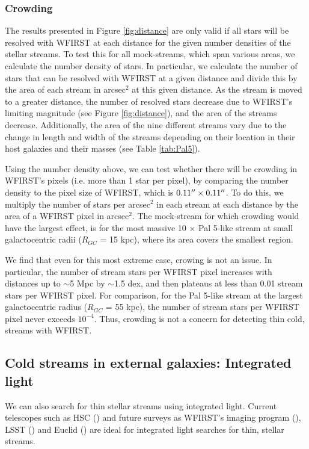 \documentclass[twocolumn]{aastex62}
\begin{document}
\subsubsection{Crowding}
\label{sec:crowding}
The results presented in Figure \ref{fig:distance} are only valid if all stars will be resolved with WFIRST at each distance for the given number densities of the stellar streams. To test this for all mock-streams, which span various areas, we calculate the number density of stars. In particular, we calculate the number of stars that can be resolved with WFIRST at a given distance and divide this by the area of each stream in arcsec$^2$ at this given distance. As the stream is moved to a greater distance, the number of resolved stars decrease due to WFIRST's limiting magnitude (see Figure \ref{fig:distance}), and the area of the streams decrease. Additionally, the area of the nine different streams vary due to the change in length and width of the streams depending on their location in their host galaxies and their masses (see Table \ref{tab:Pal5}).

Using the number density above, we can test whether there will be crowding in WFIRST's pixels (i.e. more than 1 star per pixel), by comparing the number density to the pixel size of WFIRST, which is $0.11\mbox{$^{\prime\prime}$} \times 0.11\mbox{$^{\prime\prime}$}$. To do this, we multiply the number of stars per arcsec$^2$ in each stream at each distance by the area of a WFIRST pixel in arcsec$^2$.  The mock-stream for which crowding would have the largest effect, is for the most massive 10 $\times$  Pal 5-like stream at small galactocentric radii ($R_{GC}$ = 15 kpc), where its area covers the smallest region. 

We find that even for this most extreme case, crowing is not an issue. In particular, the number of stream stars per WFIRST pixel increases with distances up to $\sim$5 Mpc by $\sim$1.5 dex, and then plateaus at less than 0.01 stream stars per WFIRST pixel. For comparison, for the Pal 5-like stream at the largest galactocentric radius ($R_{GC}$ = 55 kpc), the number of stream stars per WFIRST pixel never exceeds $10^{-4}$. Thus, crowding is not a concern for detecting thin cold, streams with WFIRST. 





\subsection{Cold streams in external galaxies: Integrated light}
\label{sec:integrated}
We can also search for thin stellar streams using integrated light. Current telescopes such as HSC (\citealt{miyazaki12}) and future surveys as WFIRST's imaging program (\citealt{spergel13}), LSST (\citealt{ivezi08}) and Euclid (\citealt{racca16}) are ideal for integrated light searches for thin, stellar streams. 
\end{document}
